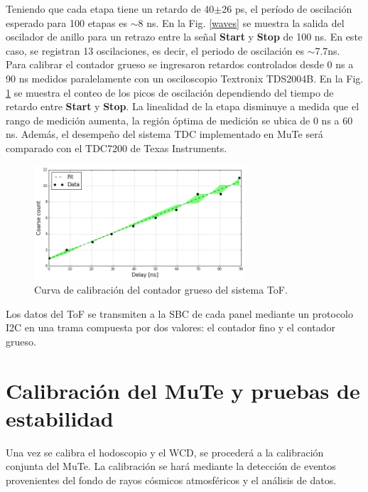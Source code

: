 Teniendo que cada etapa tiene un retardo de 40$\pm$26 ps, el período de oscilación esperado para 100 etapas es $\sim$8 ns. En la Fig. \ref{waves} se muestra la salida del oscilador de anillo para un retrazo entre la señal \textbf{Start} y \textbf{Stop} de 100 ns. En este caso, se registran 13 oscilaciones, es decir, el periodo de oscilación es $\sim$7.7ns.\\



Para calibrar el contador grueso se ingresaron retardos controlados desde 0 ns a 90 ns medidos paralelamente con un osciloscopio Textronix TDS2004B. En la Fig. \ref{CalCoarse} se muestra el conteo de los picos de oscilación dependiendo del tiempo de retardo entre \textbf{Start} y \textbf{Stop}. La linealidad de la etapa disminuye a medida que el rango de medición aumenta, la región óptima de medición se ubica de 0 ns a 60 ns. Además, el desempeño del sistema TDC implementado en MuTe será comparado con el TDC7200 de Texas Instruments.

\begin{figure}[h!]
\begin{center}
\includegraphics[width=0.7\textwidth]{Figures/Cal_coarse}
\caption{Curva de calibración del contador grueso del sistema ToF.}
\label{CalCoarse}
\end{center}
\end{figure}

Los datos del ToF se transmiten a la SBC de cada panel mediante un protocolo I2C en una trama compuesta por dos valores: el contador fino y el contador grueso.

\section{Calibración del MuTe y pruebas de estabilidad}

Una vez se calibra el hodoscopio y el WCD, se procederá a la calibración conjunta del MuTe. La calibración se hará mediante la detección de eventos provenientes del fondo de rayos cósmicos atmosféricos y el análisis de datos.\\

